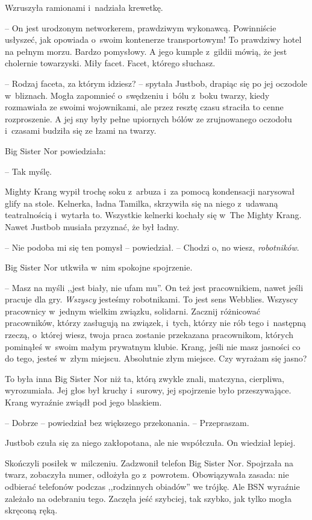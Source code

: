 \documentclass[oneside,polish,11pt,rmheadings]{mwbk}
\begin{document}
Wzruszyła ramionami i~nadziała krewetkę. 

-- On jest urodzonym networkerem, prawdziwym wykonawcą. Powinniście usłyszeć, jak opowiada o~swoim kontenerze transportowym! To prawdziwy hotel na pełnym morzu. Bardzo pomysłowy. A jego kumple z~gildii mówią, że jest cholernie towarzyski. Miły facet. Facet, którego słuchasz.

-- Rodzaj faceta, za którym idziesz? -- spytała Justbob, drapiąc się po jej oczodole w~bliznach. Mogła zapomnieć o~swędzeniu i~bólu z~boku twarzy, kiedy rozmawiała ze swoimi wojownikami, ale przez resztę czasu straciła to cenne rozproszenie. A jej sny były pełne upiornych bólów ze zrujnowanego oczodołu i~czasami budziła się ze łzami na twarzy.

Big Sister Nor powiedziała: 

-- Tak myślę.

Mighty Krang wypił trochę soku z~arbuza i~za pomocą kondensacji narysował glify na stole. Kelnerka, ładna Tamilka, skrzywiła się na niego z~udawaną teatralnością i~wytarła to. Wszystkie kelnerki kochały się w~The Mighty Krang. Nawet Justbob musiała przyznać, że był ładny. 

-- Nie podoba mi się ten pomysł -- powiedział. -- Chodzi o, no wiesz, \textit{robotników}.

Big Sister Nor utkwiła w~nim spokojne spojrzenie. 

-- Masz na myśli ,,jest biały, nie ufam mu''. On też jest pracownikiem, nawet jeśli pracuje dla gry. \textit{Wszyscy }jesteśmy robotnikami. To jest sens Webblies. Wszyscy pracownicy w~jednym wielkim związku, solidarni. Zacznij różnicować pracowników, którzy zasługują na związek, i~tych, którzy nie rób tego i~następną rzeczą, o~której wiesz, twoja praca zostanie przekazana pracownikom, których pominąłeś w~swoim małym prywatnym klubie. Krang, jeśli nie masz jasności co do tego, jesteś w~złym miejscu. Absolutnie złym miejsce. Czy wyrażam się jasno? 

To była inna Big Sister Nor niż ta, którą zwykle znali, matczyna, cierpliwa, wyrozumiała. Jej głos był kruchy i~surowy, jej spojrzenie było przeszywające. Krang wyraźnie zwiądł pod jego blaskiem. 

-- Dobrze -- powiedział bez większego przekonania. -- Przepraszam. 

Justbob czuła się za niego zakłopotana, ale nie współczuła. On wiedział lepiej.

Skończyli posiłek w~milczeniu. Zadzwonił telefon Big Sister Nor. Spojrzała na twarz, zobaczyła numer, odłożyła go z~powrotem. Obowiązywała zasada: nie odbierać telefonów podczas ,,rodzinnych obiadów'' we trójkę. Ale BSN wyraźnie zależało na odebraniu tego. Zaczęła jeść szybciej, tak szybko, jak tylko mogła skręconą ręką.
\end{document}
